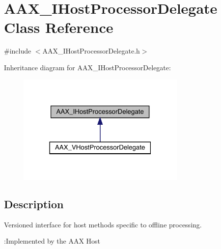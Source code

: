 \hypertarget{a01837}{}\section{A\+A\+X\+\_\+\+I\+Host\+Processor\+Delegate Class Reference}
\label{a01837}


{\ttfamily \#include $<$A\+A\+X\+\_\+\+I\+Host\+Processor\+Delegate.\+h$>$}



Inheritance diagram for A\+A\+X\+\_\+\+I\+Host\+Processor\+Delegate\+:
\nopagebreak
\begin{figure}[H]
\begin{center}
\leavevmode
\includegraphics[width=234pt]{a01836}
\end{center}
\end{figure}


\subsection{Description}
Versioned interface for host methods specific to offline processing. 

\begin{DoxyRefDesc}{\+:\+Implemented by the A\+A\+X Host}
\item[\mbox{\hyperlink{a00790__aax_host_implementation000007}{\+:\+Implemented by the A\+A\+X Host}}]\end{DoxyRefDesc}


